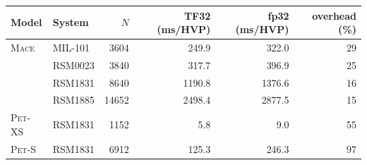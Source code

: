 \begin{tabular}{ll rrrr}
\toprule
           Model  &            System  &               $N$  &  TF32 (\si{\milli\second}/HVP)  &  fp32 (\si{\milli\second}/HVP)  &     overhead (\%) \\ 
\midrule
   \textsc{Mace}  &           MIL-101  &        \num{3604}  &       \num{249.9}  &       \num{322.0}  &          \num{29} \\ 
                  &           RSM0023  &        \num{3840}  &       \num{317.7}  &       \num{396.9}  &          \num{25} \\ 
                  &           RSM1831  &        \num{8640}  &      \num{1190.8}  &      \num{1376.6}  &          \num{16} \\ 
                  &           RSM1885  &       \num{14652}  &      \num{2498.4}  &      \num{2877.5}  &          \num{15} \\ 
\midrule
 \textsc{Pet}-XS  &           RSM1831  &        \num{1152}  &         \num{5.8}  &         \num{9.0}  &          \num{55} \\ 
\midrule
  \textsc{Pet}-S  &           RSM1831  &        \num{6912}  &       \num{125.3}  &       \num{246.3}  &          \num{97} \\ 
\bottomrule
\end{tabular}
